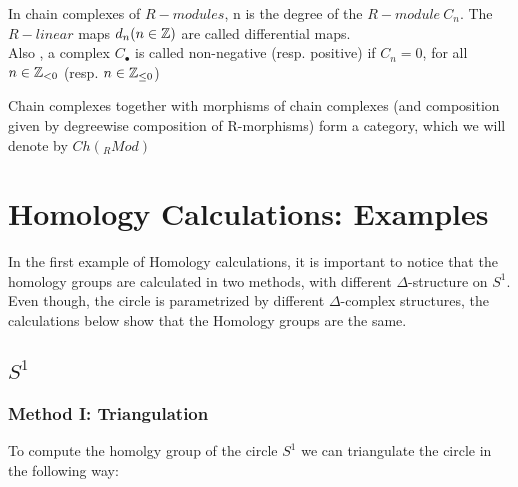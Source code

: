\documentclass[11pt,a4paper]{report}
\begin{document}
        In chain complexes of $R-modules$, n is the degree of the $R-module \ C_n$. The $R-linear$ maps 
        $d_n (n \in \mathbb{Z})$ are called differential maps. \\
        Also , a complex $C_\bullet$ is called non-negative (resp. positive) if $C_n = 0$, for all $n \in \mathbb{Z}_{<0}$ (resp. $n \in \mathbb{Z}_{\leq 0}$)
        
        Chain complexes together with morphisms of chain complexes (and composition given by
        degreewise composition of R-morphisms) form a category, which we will denote by $Ch(_RMod)$

		 \section{Homology Calculations: Examples}
		 
		 In the first example of Homology calculations, it is important to notice that the homology groups are
		 calculated in two methods, with different $\Delta$-structure on $S^1$. Even though, the circle is 
		 parametrized by different $\Delta$-complex structures, the calculations below show that the Homology groups are the same. 
              \subsection{$ S^1$}
                \subsubsection{Method I: Triangulation}
                To compute the homolgy group of the circle $S^1$ we can triangulate the circle in the following way: \\
                
\end{document}
